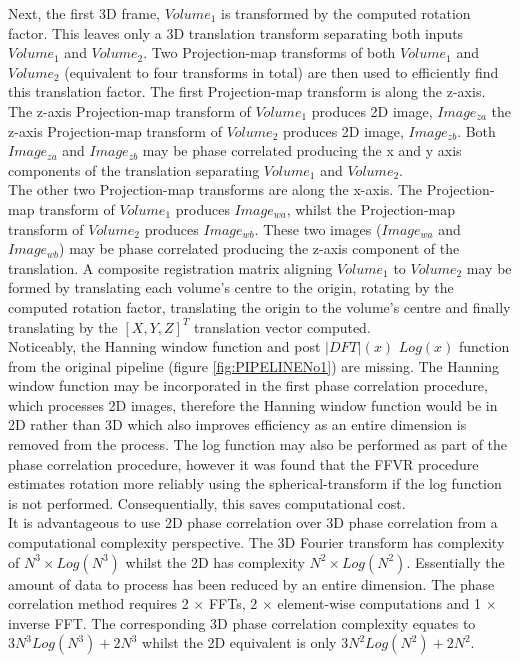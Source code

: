 Next, the first 3D frame, $Volume_1$ is transformed by the computed rotation factor. This leaves only a 3D translation transform separating both inputs $Volume_1$ and $Volume_2$. Two Projection-map transforms of both $Volume_1$ and $Volume_2$ (equivalent to four transforms in total) are then used to efficiently find this translation factor. The first Projection-map transform is along the z-axis. The z-axis Projection-map transform of $Volume_1$ produces 2D image, $Image_{za}$ the z-axis Projection-map transform of $Volume_2$ produces 2D image, $Image_{zb}$. Both $Image_{za}$ and $Image_{zb}$ may be phase correlated producing the x and y axis components of the translation separating $Volume_1$ and $Volume_2$. \\

The other two Projection-map transforms are along the x-axis. The Projection-map transform of $Volume_1$ produces $Image_{wa}$, whilst the Projection-map transform of $Volume_2$ produces $Image_{wb}$. These two images ($Image_{wa}$ and $Image_{wb}$) may be phase correlated producing the z-axis component of the translation. A composite registration matrix aligning $Volume_1$ to $Volume_2$ may be formed by translating each volume's centre to the origin, rotating by the computed rotation factor, translating the origin to the volume's centre and finally translating by the $[X,Y,Z]^T$ translation vector computed. \\

Noticeably, the Hanning window function and post $|DFT|(x)$ $Log(x)$ function from the original pipeline (figure \ref{fig:PIPELINENo1}) are missing. The Hanning window function may be incorporated in the first phase correlation procedure, which processes 2D images, therefore the Hanning window function would be in 2D rather than 3D which also improves efficiency as an entire dimension is removed from the process. The log function may also be performed as part of the phase correlation procedure, however it was found that the FFVR procedure estimates rotation more reliably using the spherical-transform if the log function is not performed. Consequentially, this saves computational cost. \\

It is advantageous to use 2D phase correlation over 3D phase correlation from a computational complexity perspective. The 3D Fourier transform has complexity of $N^3 \times Log(N^3)$ whilst the 2D has complexity $N^2 \times Log(N^2)$. Essentially the amount of data to process has been reduced by an entire dimension. The phase correlation method requires 2 $\times$ FFTs, 2 $\times$ element-wise computations and 1 $\times$ inverse FFT. The corresponding 3D phase correlation complexity equates to $3N^3Log(N^3) + 2N^3$ whilst the 2D equivalent is only $3N^2Log(N^2) + 2N^2$. \\ 

